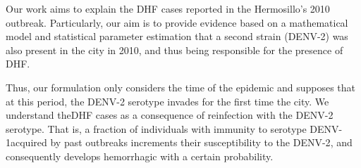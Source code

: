     Our work aims to explain the \ac{DHF} cases reported in the Hermosillo's 
2010 outbreak. Particularly, our aim is to provide evidence based on a mathematical model and statistical 
parameter estimation that a second strain (DENV-2) was also present in the city in 2010, and thus being responsible for the presence of DHF. 

Thus, our formulation only considers the time of the epidemic and
supposes that at this period, the \ac{DENV-2} serotype invades for the first 
time the city. We understand the\ac{DHF} cases as a consequence of reinfection 
with the \ac{DENV-2} serotype. That is, a fraction of individuals with immunity 
to serotype \ac{DENV-1}\textemdash acquired by past outbreaks\textemdash 
increments their susceptibility to the \ac{DENV-2}, and consequently 
develops hemorrhagic with a certain probability.


